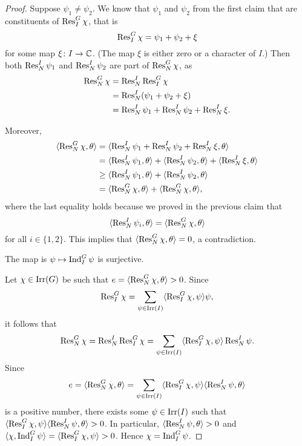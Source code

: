 \begin{proof}
    Suppose $\psi_1\ne\psi_2$. 
    We know that $\psi_1$ and $\psi_2$ from the first claim that
    are constituents
    of $\operatorname{Res}_I^G\chi$, that is 
    \[
    \operatorname{Res}_I^G\chi=\psi_1+\psi_2+\xi 
    \]
    for some map $\xi\colon I\to\mathbb{C}$. (The map $\xi$ is either zero
    or a character of $I$.) 
    Then both $\operatorname{Res}_N^I\psi_1$ and 
    $\operatorname{Res}_N^I\psi_2$ are part  
    of 
    $\operatorname{Res}_N^G\chi$, as  
    \begin{align*}
        \operatorname{Res}_N^G\chi&=\operatorname{Res}_N^I\operatorname{Res}_I^G\chi\\
        &=\operatorname{Res}_N^I(\psi_1+\psi_2+\xi)\\
        &=\operatorname{Res}_N^I\psi_1+\operatorname{Res}_N^I\psi_2+\operatorname{Res}_N^I\xi.       
    \end{align*}

    Moreover, 
    \begin{align*}
        \langle\operatorname{Res}_N^G\chi,\theta\rangle &= \langle\operatorname{Res}_N^I\psi_1+\operatorname{Res}_N^I\psi_2+\operatorname{Res}_N^I\xi,\theta\rangle\\
        &=\langle\operatorname{Res}_N^I\psi_1,\theta\rangle+\langle\operatorname{Res}_N^I\psi_2,\theta\rangle+\langle\operatorname{Res}_N^I\xi,\theta\rangle\\
&\geq\langle\operatorname{Res}_N^I\psi_1,\theta\rangle+\langle\operatorname{Res}_N^I\psi_2,\theta\rangle\\
        &=\langle\operatorname{Res}_N^G\chi,\theta\rangle+\langle\operatorname{Res}_N^G\chi,\theta\rangle,
    \end{align*}
    where the last equality holds because we proved in the previous claim that 
    \[
        \langle\operatorname{Res}_N^I\psi_i,\theta\rangle=\langle\operatorname{Res}_N^G\chi,\theta\rangle
    \]
    for all $i\in\{1,2\}$. 
    This implies that $\langle\operatorname{Res}_N^G\chi,\theta\rangle=0$, a contradiction. 

    \begin{claim}
        The map is $\psi\mapsto\operatorname{Ind}_I^G\psi$ is surjective. 
    \end{claim}

    Let $\chi\in\operatorname{Irr}(G)$ be such that 
    $e=\langle\operatorname{Res}_N^G\chi,\theta\rangle>0$. Since 
    \[
    \operatorname{Res}_I^G\chi=\sum_{\psi\in\operatorname{Irr}(I)}\langle\operatorname{Res}_I^G\chi,\psi\rangle\psi,
    \]
    it follows that 
    \[
    \operatorname{Res}_N^G\chi=\operatorname{Res}_N^I\operatorname{Res}_I^G\chi
    =\sum_{\psi\in\operatorname{Irr}(I)}\langle\operatorname{Res}_I^G\chi,\psi\rangle\operatorname{Res}_N^I\psi.
    \]
    Since 
    \[
    e=\langle\operatorname{Res}_N^G\chi,\theta\rangle=
    \sum_{\psi\in\operatorname{Irr}(I)}\langle\operatorname{Res}_I^G\chi,\psi\rangle\langle\operatorname{Res}_N^I\psi,\theta\rangle
    \]
    is a positive number, there exists some $\psi\in\operatorname{Irr}(I)$ 
    such that $\langle\operatorname{Res}_I^G\chi,\psi\rangle\langle\operatorname{Res}_N^I\psi,\theta\rangle>0$. In particular, 
    $\langle\operatorname{Res}_N^I\psi,\theta\rangle>0$ and 
    $\langle\chi,\operatorname{Ind}_I^G\psi\rangle=\langle\operatorname{Res}_I^G\chi,\psi\rangle>0$. 
    Hence $\chi=\operatorname{Ind}_I^G\psi$. 
\end{proof}

